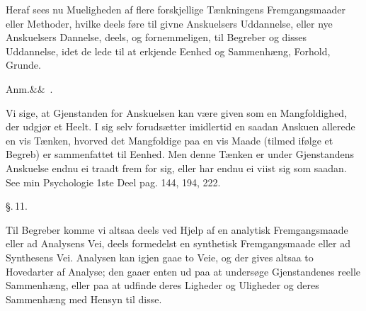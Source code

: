 \documentclass[12pt]{book}
\def\sperr#1{#1}%
\def\textit#1{#1}%
\def\emph#1{#1}%
\newcommand{\sperr}[1]{\textls[180]{#1}}
\newcommand{\rubrik}[2]{%
  \par\vspace{1.1\baselineskip}%
  \begin{center}
    {\large\textit{#1}\par}\vspace{0.35\baselineskip}
    {#2\par}
  \end{center}
  \vspace{0.5\baselineskip}
  \phantomsection
  \addcontentsline{toc}{section}{\texorpdfstring{#1\ #2}{#1 #2}}%
}
\newcommand{\parag}[1]{%
  \par\vspace{0.9\baselineskip}%
  {\centering\textit{\S.\,#1.}\par}%
  \vspace{0.35\baselineskip}%
  \noindent\hspace{\parindent}\ignorespaces
}
\newcommand{\anm}[1]{%
  \par\vspace{0.5\baselineskip}%
  \noindent\hspace{\parindent}\sperr{Anm.}\ifx&#1&\else~\textit{#1}.\fi
  \enspace\ignorespaces
}
\begin{document}
Heraf sees nu Mueligheden af flere forskjellige Tænkningens
\emph{Fremgangsmaader eller Methoder}, hvilke deels føre til givne
Anskuelsers Uddannelse, eller nye Anskuelsers Dannelse, deels, og
fornemmeligen, til Begreber og disses Uddannelse, idet de lede til at
erkjende Eenhed og Sammenhæng, Forhold, Grunde.

\anm{}
Vi sige, at Gjenstanden for Anskuelsen kan være given som en Mangfoldighed,
der udgjør et Heelt. I sig selv forudsætter imidlertid en saadan Anskuen
allerede en vis Tænken, hvorved det Mangfoldige paa en vis Maade (tilmed
ifølge et Begreb) er sammenfattet til Eenhed. Men denne Tænken er under
Gjenstandens Anskuelse endnu ei traadt frem for sig, eller har endnu ei viist
sig som saadan. See min Psychologie \textit{1}ste Deel pag. \textit{144},
\textit{194}, \textit{222}.

\parag{11}
Til Begreber komme vi altsaa deels ved Hjelp af en \emph{analytisk
Fremgangsmaade eller ad Analysens Vei}, deels formedelst en
syn\emph{thetisk Fremgangsmaade eller ad Synthesens Vei}. Analysen kan igjen
gaae to Veie, og der gives altsaa to \emph{Hovedarter af Analyse}; den gaaer
enten ud paa at undersøge Gjenstandenes \emph{reelle Sammenhæng}, eller paa
at udfinde deres \emph{Ligheder og Uligheder} og deres \emph{Sammenhæng med
Hensyn til disse}.
%
\end{document}
